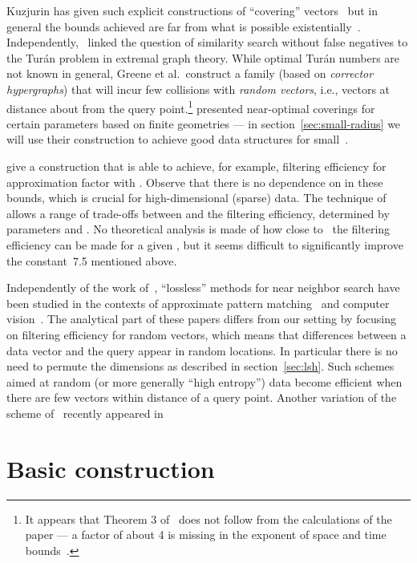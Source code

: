 \documentclass[prodmode,acmtalg]{acmsmall}
\begin{document}
Kuzjurin has given such explicit constructions of ``covering'' vectors~\cite{kuzjurin2000explicit} but in general the bounds achieved are far from what is possible existentially~\cite{Kuzjurin:1995:DAG:204515.204520}.
Independently,~\cite{greene1994multi} linked the question of similarity search without false negatives to the Turán problem in extremal graph theory.
While optimal Turán numbers are not known in general, Greene et al.~construct a family  (based on \emph{corrector hypergraphs}) that will incur few collisions with \emph{random vectors}, i.e., vectors at distance about  from the query point.\footnote{It appears that Theorem 3 of~\cite{greene1994multi} does not follow from the calculations of the paper --- a factor of about 4 is missing in the exponent of space and time bounds~\cite{ParnasPersonalCommunication}.}
\cite{gordon1995new} presented near-optimal coverings for certain parameters based on finite geometries --- in section~\ref{sec:small-radius} we will use their construction to achieve good data structures for small~.

\cite{Arasu_VLDB06} give a construction that is able to achieve, for example,  filtering efficiency for approximation factor  with .
Observe that there is no dependence on  in these bounds, which is crucial for high-dimensional (sparse) data.
The technique of~\cite{Arasu_VLDB06} allows a range of trade-offs between  and the filtering efficiency, determined by parameters  and .
No theoretical analysis is made of how close to~ the filtering efficiency can be made for a given , but it seems difficult to significantly improve the constant~7.5 mentioned above.

Independently of the work of~\cite{Arasu_VLDB06}, ``lossless'' methods for near neighbor search have been studied in the contexts of approximate pattern matching~\cite{kucherov2005multiseed} and computer vision~\cite{norouzi2012fast}.
The analytical part of these papers differs from our setting by focusing on filtering efficiency for random vectors, which means that differences between a data vector and the query appear in random locations. 
In particular there is no need to permute the dimensions as described in section~\ref{sec:lsh}.
Such schemes aimed at random (or more generally ``high entropy'') data become efficient when there are few vectors within distance  of a query point.
Another variation of the scheme of~\cite{Arasu_VLDB06} recently appeared in~\cite{DBLP:journals/pvldb/DengLWF15}



\section{Basic construction}\label{sec:basic}
\end{document}
